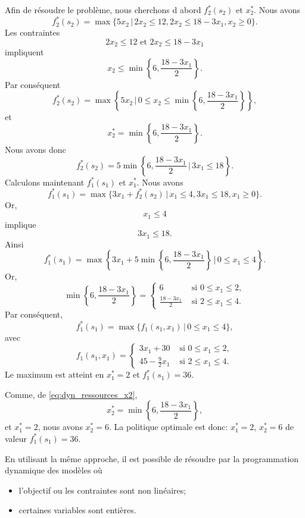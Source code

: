 \begin{example}
Afin de résoudre le problème, nous cherchons d abord $f_2^*(s_2)$ et $x_2^*$.
Nous avons
\[
 f_2^*(s_2) = \max \lbrace 5x_2\,|\,2x_2 \leq 12, 2x_2 \leq18-3x_1, x_2 \geq 0 \rbrace.
 \]
 Les contraintes
 \[
 2x_2 \leq12\mbox{ et }2x_2 \leq18-3x_1
 \]
 impliquent
 \[
 x_2 \leq \min \left\lbrace 6, \frac{18-3x_1}{2} \right\rbrace.
 \]
 Par conséquent
 \[
 f_2^*(s_2) = \max \left\lbrace 5x_2\,|\,0 \leq x_2 \leq \min \left\lbrace 6, \frac{18-3x_1}{2} \right\rbrace \right\rbrace,
 \]
 et
 \begin{equation}
 x_2^* = \min \left\lbrace 6, \frac{18-3x_1}{2} \right\rbrace.
\label{eq:dyn_ressources_x2}
 \end{equation}
 Nous avons donc
 \[
 f_2^*(s_2) = 5 \min \left\lbrace 6, \frac{18-3x_1}{2} \,|\, 3x_1 \leq18 \right\rbrace.
 \]
Calculons maintenant $f_1^*(s_1)$ et $x_1^*$.
Nous avons
\[
f_1^*(s_1) = \max \lbrace 3x_1+f_2^*(s_2)\,|\,x_1 \leq 4, 3x_1 \leq18, x_1\geq 0 \rbrace.
\]
Or,
\[
x_1 \leq 4
\]
implique
\[
3x_1 \leq 18.
\]
Ainsi
\[
 f_1^*(s_1) = \max \left\lbrace 3x_1+5 \min \left\lbrace 6, \frac{18-3x_1}{2}  \right\rbrace \,|\, 0 \leq x_1 \leq 4 \right\rbrace.
 \]
Or,
\[
\min \left\lbrace 6, \frac{18-3x_1}{2} \right\rbrace =
\begin{cases}
 6 & \mbox{ si } 0 \leq x_1\leq 2, \\
\frac{18-3x_1}{2} & \mbox{ si } 2 \leq x_1 \leq 4.
\end{cases}
\]
Par conséquent,
\[
f_1^*(s_1) = \max \lbrace f_1(s_1,x_1) \,|\,0 \leq x_1\leq 4 \rbrace,
\]
avec
\[
f_1(s_1,x_1) =
\begin{cases}
3x_1 + 30 & \mbox{ si } 0 \leq x_1 \leq 2, \\
45 - \frac{9}{2}x_1 & \mbox{ si } 2 \leq x_1 \leq 4.
\end{cases}
\]
Le maximum est atteint en $x_1^* = 2$ et $f_1^*(s_1) = 36$.

Comme, de \eqref{eq:dyn_ressources_x2},
\[
 x_2^* = \min \left\lbrace 6, \frac{18-3x_1}{2} \right\rbrace,
\]
et $x_1^* = 2$, nous avons $x_2^* = 6$.
La politique optimale est donc: $x_1^* = 2$, $x_2^* = 6$ de valeur $f_1^*(s_1) = 36$.

En utilisant la même approche, il est possible de résoudre par la programmation dynamique des modèles où
\begin{itemize}
\item
l'objectif ou les contraintes sont non linéaires;
\item
certaines variables sont entières.
\end{itemize}
\end{example}

